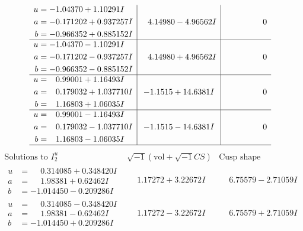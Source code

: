 \documentclass[1p]{elsarticle_modified}
\theoremstyle{definition}
\newcommand{\I}{\sqrt{-1}}
\begin{document}
$$\begin{array}{c|c|c}
\begin{aligned}
u &= -1.04370 + 1.10291 I \\
a &= -0.171202 + 0.937257 I \\
b &= -0.966352 + 0.885152 I\end{aligned}
 & \phantom{-}4.14980 - 4.96562 I & \phantom{-0.000000 } 0 \\ \hline\begin{aligned}
u &= -1.04370 - 1.10291 I \\
a &= -0.171202 - 0.937257 I \\
b &= -0.966352 - 0.885152 I\end{aligned}
 & \phantom{-}4.14980 + 4.96562 I & \phantom{-0.000000 } 0 \\ \hline\begin{aligned}
u &= \phantom{-}0.99001 + 1.16493 I \\
a &= \phantom{-}0.179032 + 1.037710 I \\
b &= \phantom{-}1.16803 + 1.06035 I\end{aligned}
 & -1.1515 + 14.6381 I & \phantom{-0.000000 } 0 \\ \hline\begin{aligned}
u &= \phantom{-}0.99001 - 1.16493 I \\
a &= \phantom{-}0.179032 - 1.037710 I \\
b &= \phantom{-}1.16803 - 1.06035 I\end{aligned}
 & -1.1515 - 14.6381 I & \phantom{-0.000000 } 0\\
 \hline 
 \end{array}$$\newpage$$\begin{array}{c|c|c}  
\text{Solutions to }I^u_{2}& \I (\text{vol} + \sqrt{-1}CS) & \text{Cusp shape}\\
 \hline 
\begin{aligned}
u &= \phantom{-}0.314085 + 0.348420 I \\
a &= \phantom{-}1.98381 + 0.62462 I \\
b &= -1.014450 - 0.209286 I\end{aligned}
 & \phantom{-}1.17272 + 3.22672 I & \phantom{-}6.75579 - 2.71059 I \\ \hline\begin{aligned}
u &= \phantom{-}0.314085 - 0.348420 I \\
a &= \phantom{-}1.98381 - 0.62462 I \\
b &= -1.014450 + 0.209286 I\end{aligned}
 & \phantom{-}1.17272 - 3.22672 I & \phantom{-}6.75579 + 2.71059 I \\ \hline\begin{aligned}

\end{aligned}
\end{array}$$
\end{document}
